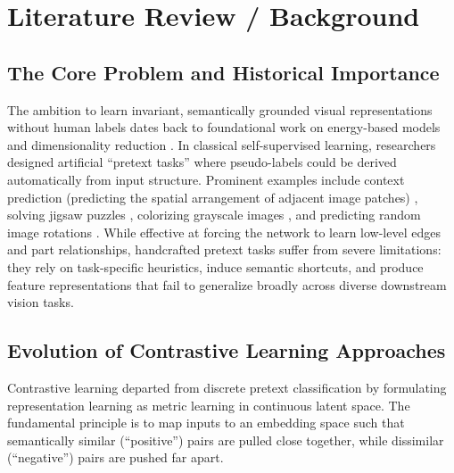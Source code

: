 \documentclass[conference]{IEEEtran}
\begin{document}
\section{Literature Review / Background}
\subsection{The Core Problem and Historical Importance}
The ambition to learn invariant, semantically grounded visual representations without human labels dates back to foundational work on energy-based models and dimensionality reduction \cite{hadsell2006dimensionality}. In classical self-supervised learning, researchers designed artificial ``pretext tasks'' where pseudo-labels could be derived automatically from input structure. Prominent examples include context prediction (predicting the spatial arrangement of adjacent image patches) \cite{doersch2015unsupervised}, solving jigsaw puzzles \cite{noroozi2016unsupervised}, colorizing grayscale images \cite{zhang2016colorful}, and predicting random image rotations \cite{gidaris2018unsupervised}. While effective at forcing the network to learn low-level edges and part relationships, handcrafted pretext tasks suffer from severe limitations: they rely on task-specific heuristics, induce semantic shortcuts, and produce feature representations that fail to generalize broadly across diverse downstream vision tasks.

\subsection{Evolution of Contrastive Learning Approaches}
Contrastive learning departed from discrete pretext classification by formulating representation learning as metric learning in continuous latent space. The fundamental principle is to map inputs to an embedding space such that semantically similar (``positive'') pairs are pulled close together, while dissimilar (``negative'') pairs are pushed far apart.
\end{document}
